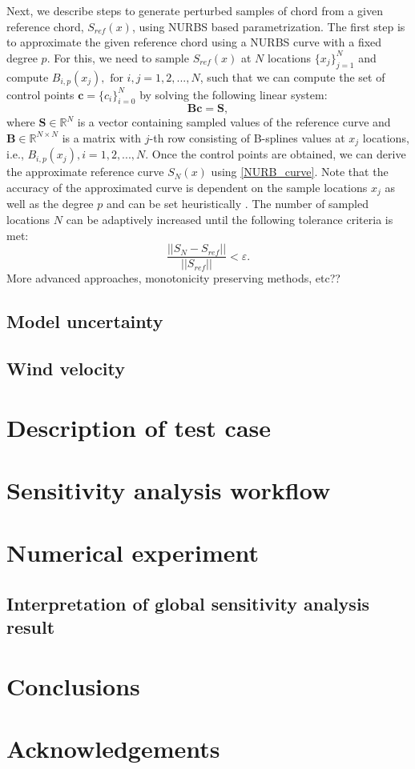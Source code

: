 \documentclass[review]{elsarticle}
\newtheorem{remark}{Remark}[section]
\numberwithin{equation}{section}
\newcommand{\myreferences}{./Bibliography/references}
\numberwithin{equation}{section}
\begin{document}
Next, we describe steps to generate perturbed samples of chord from a given reference chord, $S_{ref}(x)$, using NURBS based parametrization. The first step is to approximate the given reference chord using a NURBS curve with a fixed degree $p$. For this, we need to sample $S_{ref}(x)$ at $N$ locations $\{x_j\}_{j=1}^N$ and compute $B_{i,p}(x_j), \text{ for }i, j = 1,2, ..., N$, such that we can compute the set of control points $\mathbf{c}=\{c_i\}_{i=0}^N$ by solving the following linear system:
\begin{equation}\label{nurbs_inversion}
\mathbf{B}\mathbf{c} = \mathbf{S},
\end{equation}
where $\mathbf{S}\in \mathbb{R}^{N}$ is a vector containing sampled values of the reference curve and $\mathbf{B}\in \mathbb{R}^{N\times N}$ is a matrix with $j$-th row consisting of B-splines values at $x_j$ locations, i.e., $B_{i,p}(x_j), i= 1, 2,..., N$. 
Once the control points are obtained, we can derive the approximate reference curve $S_N(x)$ using \eqref{NURB_curve}. Note that the accuracy of the approximated curve is dependent on the sample locations $x_j$ as well as the degree $p$ and can be set heuristically \cite{adaptiveNurbs}. The number of sampled locations $N$ can be adaptively increased until the following tolerance criteria is met:
\begin{equation}
\frac{||S_N - S_{ref}||}{||S_{ref}||} <\varepsilon.
\end{equation}
More advanced approaches, monotonicity preserving methods, etc??
%
\subsection{Model uncertainty}
\subsection{Wind velocity}
\section{Description of test case}
\section{Sensitivity analysis workflow}
\section{Numerical experiment}
\subsection{Interpretation of global sensitivity analysis result}
\section{Conclusions}
\section*{Acknowledgements}

\end{document}
